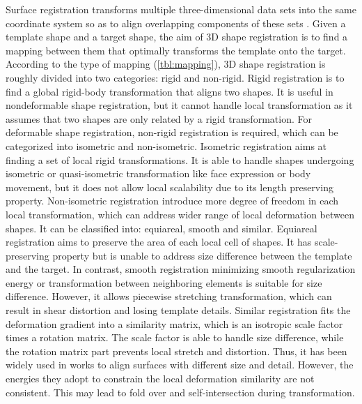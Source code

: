 Surface registration transforms multiple three-dimensional data sets into the same coordinate system so as to align overlapping components of these sets \citep{tam2013registration}. Given a template shape and a target shape, the aim of 3D shape registration is to find a mapping between them that optimally transforms the template onto the target. According to the type of mapping (\ref{tbl:mapping}), 3D shape registration is roughly divided into two categories: rigid and non-rigid. Rigid registration is to find a global rigid-body transformation that aligns two shapes. It is useful in nondeformable shape registration, but it cannot handle local transformation as it assumes that two shapes are only related by a rigid transformation. For deformable shape registration, non-rigid registration is required, which can be categorized into isometric and non-isometric. Isometric registration aims at finding a set of local rigid transformations. It is able to handle shapes undergoing isometric or quasi-isometric transformation like face expression or body movement, but it does not allow local scalability due to its length preserving property. Non-isometric registration introduce more degree of freedom in each local transformation, which can address wider range of local deformation between shapes. It
can be classified into: equiareal, smooth and similar.  Equiareal registration aims to preserve the area of each local cell of shapes. It has scale-preserving property but is unable to address size difference between the template and the target. In contrast, smooth registration minimizing smooth regularization energy or transformation between neighboring elements is suitable for size difference. However, it allows piecewise stretching transformation, which can result in shear distortion and losing template details. Similar registration fits the deformation gradient into a similarity matrix, which is an isotropic scale factor times a rotation matrix. The scale factor is able to handle size difference, while the rotation matrix part prevents local stretch and distortion. Thus, it has been widely used in works \citep{yamazaki2013non,yoshiyasu2014conformal,papazov2011deformable} to align surfaces with different size and detail. However, the energies they adopt to constrain the local deformation similarity are not consistent. This may lead to fold over and self-intersection during transformation.

